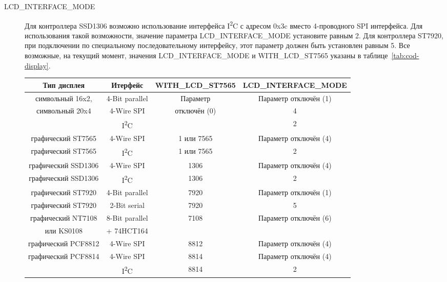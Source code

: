 \begin{description}
 \item[LCD\_INTERFACE\_MODE] Для контроллера SSD1306 возможно использование интерфейса I\textsuperscript{2}C с адресом 0x3c
вместо 4-проводного SPI интерфейса. Для использования такой возможности, значение параметра 
LCD\_INTERFACE\_MODE установите равным 2.
Для контроллера ST7920, при подключении по специальному последовательному интерфейсу, этот параметр должен быть установлен равным 5.
Все возможные, на текущий момент, значения LCD\_INTERFACE\_MODE и WITH\_LCD\_ST7565 указаны в таблице~\ref{tab:cod-display}.

\begin{table}[H]
  \begin{center}
    \begin{tabular}{| c | c | c | c|}
    \hline
  Тип дисплея         &  Итерфейс        & WITH\_LCD\_ST7565 & LCD\_INTERFACE\_MODE \\
    \hline
    \hline
  символьный 16x2,    & 4-Bit parallel   & Параметр        &  Параметр отключён (1) \\
  символьный 20x4     & 4-Wire SPI        & отключён (0)    &    4  \\
                     & I\textsuperscript{2}C &            &   2 \\
    \hline
  графический ST7565  & 4-Wire SPI        & 1 или 7565      &  Параметр отключён (4) \\
    \hline
  графический ST7565  & I\textsuperscript{2}C & 1 или 7565 &   2 \\
    \hline
  графический SSD1306 & 4-Wire SPI        & 1306            &  Параметр отключён (4) \\
    \hline
  графический SSD1306 & I\textsuperscript{2}C & 1306       &   2 \\
    \hline
  графический ST7920  & 4-Bit parallel   & 7920            &  Параметр отключён (1) \\
    \hline
  графический ST7920  & 2-Bit serial     & 7920            &   5 \\
    \hline
  графический NT7108  & 8-Bit parallel   & 7108            &  Параметр отключён (6) \\
      или KS0108      &    + 74HCT164    &                 &     \\
    \hline
  графический PCF8812 & 4-Wire SPI       &   8812          &  Параметр отключён (4) \\
    \hline
  графический PCF8814 & 4-Wire SPI       &   8814          &  Параметр отключён (4) \\
                    & I\textsuperscript{2}C & 8814         &   2 \\

\end{tabular}
\end{center}
\end{table}
\end{description}
